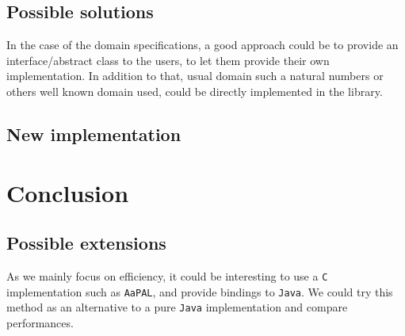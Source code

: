 \documentclass[letterpaper]{memoir}
\begin{document}
\section{Possible solutions}

In the case of the domain specifications, a good approach could be to
provide an interface/abstract class to the users, to let them provide
their own implementation. In addition to that, usual domain such a
natural numbers or others well known domain used, could be directly implemented
in the library.


\section{New implementation}


\chapter{Conclusion}


\section{Possible extensions}


As we mainly focus on efficiency, it could be interesting to use a \texttt{C}
implementation such as \texttt{AaPAL},
and provide bindings to \texttt{Java}. We could try
this method as an alternative to a pure \texttt{Java} implementation and
compare performances.





\end{document}
